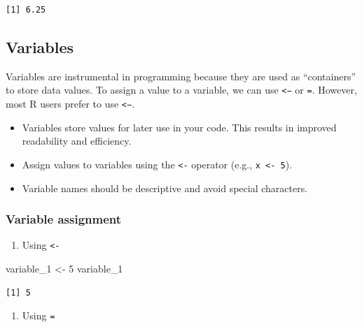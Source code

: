 \documentclass[
  letterpaper,
  DIV=11,
  numbers=noendperiod]{scrreprt}
\newenvironment{Shaded}{\begin{snugshade}}{\end{snugshade}}
\newcommand{\DecValTok}[1]{\textcolor[rgb]{0.68,0.00,0.00}{#1}}
\newcommand{\NormalTok}[1]{\textcolor[rgb]{0.00,0.23,0.31}{#1}}
\newcommand{\OtherTok}[1]{\textcolor[rgb]{0.00,0.23,0.31}{#1}}
\providecommand{\tightlist}{%
  \setlength{\itemsep}{0pt}\setlength{\parskip}{0pt}}\usepackage{longtable,booktabs,array}
\begin{document}
\begin{verbatim}
[1] 6.25
\end{verbatim}

\subsection{Variables}\label{variables}

Variables are instrumental in programming because they are used as
``containers'' to store data values. To assign a value to a variable, we
can use \texttt{\textless{}−} or \texttt{=}. However, most R users
prefer to use \texttt{\textless{}−}.

\begin{itemize}
\tightlist
\item
  Variables store values for later use in your code. This results in
  improved readability and efficiency.
\item
  Assign values to variables using the \texttt{\textless{}-} operator
  (e.g., \texttt{x\ \textless{}-\ 5}).
\item
  Variable names should be descriptive and avoid special characters.
\end{itemize}

\subsubsection{Variable assignment}\label{variable-assignment}

\begin{enumerate}
\def\labelenumi{\arabic{enumi}.}
\tightlist
\item
  Using \texttt{\textless{}-}
\end{enumerate}

\begin{Shaded}
\begin{Highlighting}[]
\NormalTok{variable\_1 }\OtherTok{\textless{}{-}} \DecValTok{5}
\NormalTok{variable\_1}
\end{Highlighting}
\end{Shaded}

\begin{verbatim}
[1] 5
\end{verbatim}

\begin{enumerate}
\def\labelenumi{\arabic{enumi}.}
\setcounter{enumi}{1}
\tightlist
\item
  Using \texttt{=}
\end{enumerate}
\end{document}
